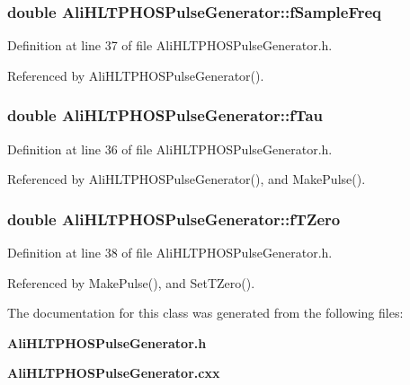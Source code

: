 \subsubsection{\setlength{\rightskip}{0pt plus 5cm}double {\bf Ali\-HLTPHOSPulse\-Generator::f\-Sample\-Freq}\hspace{0.3cm}{\tt  [private]}}\label{classAliHLTPHOSPulseGenerator_AliHLTPHOSPulseGeneratorr3}




Definition at line 37 of file Ali\-HLTPHOSPulse\-Generator.h.

Referenced by Ali\-HLTPHOSPulse\-Generator().
\subsubsection{\setlength{\rightskip}{0pt plus 5cm}double {\bf Ali\-HLTPHOSPulse\-Generator::f\-Tau}\hspace{0.3cm}{\tt  [private]}}\label{classAliHLTPHOSPulseGenerator_AliHLTPHOSPulseGeneratorr2}




Definition at line 36 of file Ali\-HLTPHOSPulse\-Generator.h.

Referenced by Ali\-HLTPHOSPulse\-Generator(), and Make\-Pulse().
\subsubsection{\setlength{\rightskip}{0pt plus 5cm}double {\bf Ali\-HLTPHOSPulse\-Generator::f\-TZero}\hspace{0.3cm}{\tt  [private]}}\label{classAliHLTPHOSPulseGenerator_AliHLTPHOSPulseGeneratorr4}




Definition at line 38 of file Ali\-HLTPHOSPulse\-Generator.h.

Referenced by Make\-Pulse(), and Set\-TZero().

The documentation for this class was generated from the following files:\begin{CompactItemize}
\item 
{\bf Ali\-HLTPHOSPulse\-Generator.h}\item 
{\bf Ali\-HLTPHOSPulse\-Generator.cxx}\end{CompactItemize}
